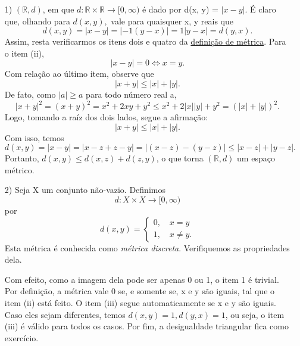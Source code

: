 \documentclass[metric_notes.tex]{subfiles}
\begin{document}
\begin{example}
	\begin{itemize}

		\item[1)] \((\mathbb{R}, d)\), em que \(d:\mathbb{R}\times \mathbb{R}\rightarrow [0, \infty)\) é dado por
		      d(x, y) = \(|x-y|.\) É claro que, olhando para \(d(x,y),\) vale para quaisquer x, y reais que
		      \[
			      d(x, y) = |x-y| = |-1(y-x)| = 1|y-x| = d(y, x).
		      \]
		      Assim, resta verificarmos os itens dois e quatro da \hyperlink{def_metric}{definição de métrica}. Para o item (ii),
		      \[
			      |x-y| = 0 \Longleftrightarrow x = y.
		      \]
		      Com relação ao último item, observe que
		      \[
			      |x+y|\leq |x| + |y|.
		      \]
		      De fato, como \(|a|\geq a\) para todo número real a,
		      \[
			      |x+y|^{2} = (x+y)^{2} = x^{2} + 2xy +y^{2}\leq x^{2} + 2|x||y| + y^{2} = (|x| + |y|)^{2}.
		      \]
		      Logo, tomando a raíz dos dois lados, segue a afirmação:
		      \[
			      |x+y|\leq |x| + |y|.
		      \]
		      Com isso, temos
		      \[
			      d(x, y) = |x-y| = |x-z+z-y| = |(x-z)-(y-z)|\leq |x-z| + |y-z|.
		      \]
		      Portanto, \(d(x, y)\leq d(x, z) + d(z, y)\), o que torna \((\mathbb{R}, d)\) um espaço métrico.

		\item[2)] Seja X um conjunto não-vazio. Definimos
		      \[
			      d:X\times X\rightarrow [0, \infty)
		      \]
		      por
		      \[
			      d(x, y) = \left\{\begin{array}{ll}
				      0,\quad x = y \\
				      1,\quad x\neq y.
			      \end{array}\right.
		      \]
		      Esta métrica é conhecida como \textit{métrica discreta}. Verifiquemos as propriedades dela.

		      Com efeito, como a imagem dela pode ser apenas 0 ou 1, o item 1 é trivial. Por definição, a métrica vale 0 se,
		      e somente se, x e y são iguais, tal que o item (ii) está feito. O item (iii) segue automaticamente se x e y são iguais. Caso
		      eles sejam diferentes, temos \(d(x, y) = 1, d(y, x) = 1\), ou seja, o item (iii) é válido para todos os casos. Por fim, a desigualdade triangular fica como exercício.
	\end{itemize}
\end{example}
\end{document}
